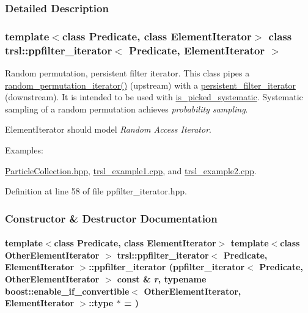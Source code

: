 \subsubsection{Detailed Description}
\subsubsection*{template$<$class Predicate, class ElementIterator$>$ class trsl::ppfilter\_\-iterator$<$ Predicate, ElementIterator $>$}

Random permutation, persistent filter iterator. This class pipes a \hyperlink{namespacetrsl_afb566791dfade70af49beaa5b816e7ee}{random\_\-permutation\_\-iterator()} (upstream) with a \hyperlink{classtrsl_1_1persistent__filter__iterator}{persistent\_\-filter\_\-iterator} (downstream). It is intended to be used with \hyperlink{classtrsl_1_1is__picked__systematic}{is\_\-picked\_\-systematic}. Systematic sampling of a random permutation achieves {\itshape probability sampling\/}.

{\ttfamily ElementIterator} should model {\itshape Random Access Iterator\/}. \begin{Desc}
\item[Examples: ]\par


\hyperlink{ParticleCollection_8hpp-example}{ParticleCollection.hpp}, \hyperlink{trsl__example1_8cpp-example}{trsl\_\-example1.cpp}, and \hyperlink{trsl__example2_8cpp-example}{trsl\_\-example2.cpp}.\end{Desc}


Definition at line 58 of file ppfilter\_\-iterator.hpp.

\subsubsection{Constructor \& Destructor Documentation}
\hypertarget{classtrsl_1_1ppfilter__iterator_a02f5b311d35437e1fca8df255a659d77}{
\paragraph[{ppfilter\_\-iterator}]{\setlength{\rightskip}{0pt plus 5cm}template$<$class Predicate, class ElementIterator$>$ template$<$class OtherElementIterator $>$ {\bf trsl::ppfilter\_\-iterator}$<$ Predicate, ElementIterator $>$::{\bf ppfilter\_\-iterator} ({\bf ppfilter\_\-iterator}$<$ Predicate, OtherElementIterator $>$ const \& {\em r}, \/  typename boost::enable\_\-if\_\-convertible$<$ OtherElementIterator, ElementIterator $>$::type $\ast$ = {})}\hfill}
\label{classtrsl_1_1ppfilter__iterator_a02f5b311d35437e1fca8df255a659d77}


